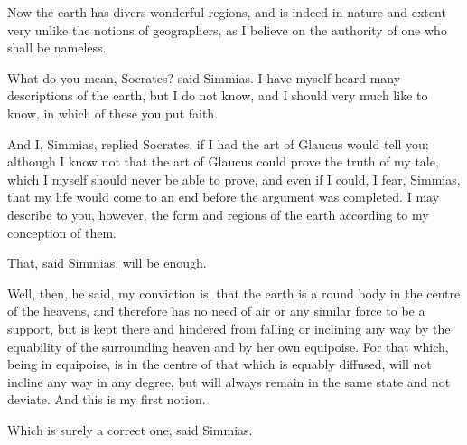 \documentclass[11pt,letter]{article}
\begin{document}
\par  Now the earth has divers wonderful regions, and is indeed in nature and extent very unlike the notions of geographers, as I believe on the authority of one who shall be nameless.

\par  What do you mean, Socrates? said Simmias. I have myself heard many descriptions of the earth, but I do not know, and I should very much like to know, in which of these you put faith.

\par  And I, Simmias, replied Socrates, if I had the art of Glaucus would tell you; although I know not that the art of Glaucus could prove the truth of my tale, which I myself should never be able to prove, and even if I could, I fear, Simmias, that my life would come to an end before the argument was completed. I may describe to you, however, the form and regions of the earth according to my conception of them.

\par  That, said Simmias, will be enough.

\par  Well, then, he said, my conviction is, that the earth is a round body in the centre of the heavens, and therefore has no need of air or any similar force to be a support, but is kept there and hindered from falling or inclining any way by the equability of the surrounding heaven and by her own equipoise. For that which, being in equipoise, is in the centre of that which is equably diffused, will not incline any way in any degree, but will always remain in the same state and not deviate. And this is my first notion.

\par  Which is surely a correct one, said Simmias.
\end{document}

